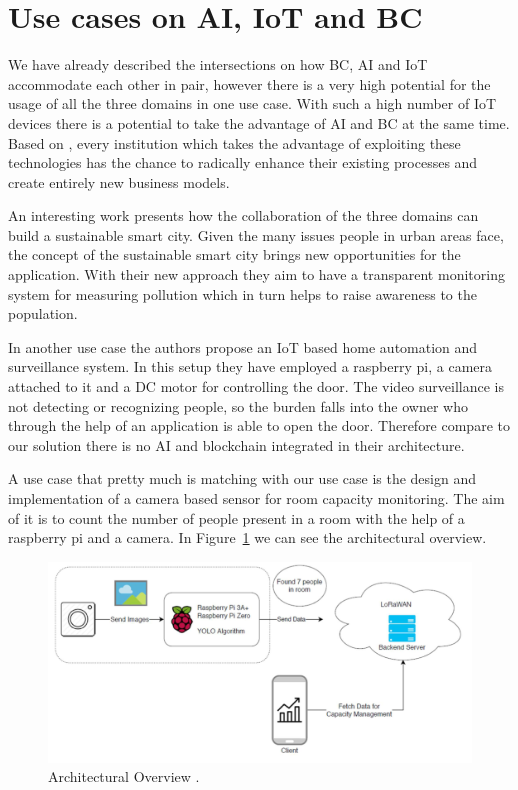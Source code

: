  
 
 
 \section{Use cases on AI, IoT and BC}
 
 We have already described the intersections on how BC, AI and IoT accommodate each other in pair, however there is a very high potential for the usage of all the three domains in one use case. With such a high number of IoT devices there is a potential to take the advantage of AI and BC at the same time. Based on \cite{oracle}, every institution  which takes the advantage of exploiting these technologies has the chance to radically enhance their existing processes and create entirely new business models. 
 
An interesting work \cite{smartcity}  presents how the collaboration of the three domains can build a sustainable smart city. Given the many issues people in urban areas face, the concept of the sustainable smart city brings new opportunities for the application. With their new approach they aim to have a transparent monitoring system for measuring pollution which in turn helps to raise awareness to the population. 

In another use case \cite{refhomeauto} the authors propose an IoT based home automation and surveillance system. In this setup they have employed a raspberry pi, a camera attached to it and a DC motor for controlling the door. The video surveillance is not detecting or recognizing people, so the burden falls into the owner who through the help of an application is able to open the door. Therefore compare to our solution there is no AI and blockchain integrated in their architecture. 


A use case that pretty much is matching with our use case is the design and implementation of a camera based sensor for room capacity monitoring. The aim of it is to count the number of people present in a room with the help of a raspberry pi and a camera. In Figure~\ref{fig:raum} we can see the architectural overview. 

\begin{figure}[!htb]
    \centering
    \includegraphics[width=1\textwidth]{figures/raumbelegung.png}
    \caption{Architectural Overview \cite{raumbelegung}.}
    \label{fig:raum}
\end{figure}

